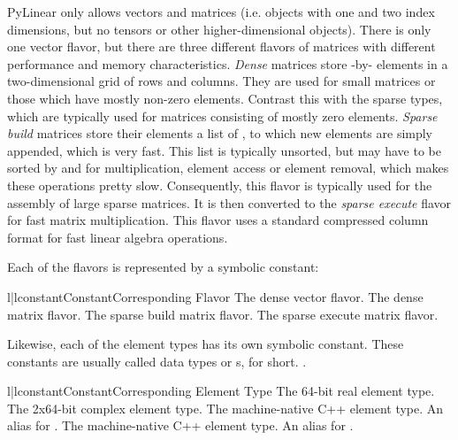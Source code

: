 PyLinear only allows vectors and matrices (i.e.  objects with one and
two index dimensions, but no tensors or other higher-dimensional
objects). There is only one vector flavor, but there are three
different flavors of matrices with different performance and memory
characteristics. \emph{Dense} matrices store -by-
elements in a two-dimensional grid of  rows and 
columns. They are used for small matrices or those which have mostly
non-zero elements. Contrast this with the sparse types, which are
typically used for matrices consisting of mostly zero
elements. \emph{Sparse build} matrices store their elements a list of
, to which new elements are simply appended,
which is very fast. This list is typically unsorted, but may have to
be sorted by  and  for multiplication, element access or
element removal, which makes these operations pretty
slow. Consequently, this flavor is typically used for the assembly of
large sparse matrices. It is then converted to the \emph{sparse
execute} flavor for fast matrix multiplication. This flavor uses a
standard compressed column format for fast linear algebra operations.

Each of the flavors is represented by a symbolic constant:

\begin{tableii}{l|l}{constant}{Constant}{Corresponding Flavor}
         {The dense vector flavor.}
         {The dense matrix flavor.}
         {The sparse build matrix flavor.}
         {The sparse execute matrix flavor.}
\end{tableii}

Likewise, each of the element types has its own symbolic constant.
These constants are usually called data types or s, 
for short.
.

\begin{tableii}{l|l}{constant}{Constant}{Corresponding Element Type}
         {The 64-bit real element type.}
         {The 2x64-bit complex element type.}
         {The machine-native C++  element type.
          An alias for .}
         {The machine-native C++  
          element type. An alias for .}
\end{tableii}

